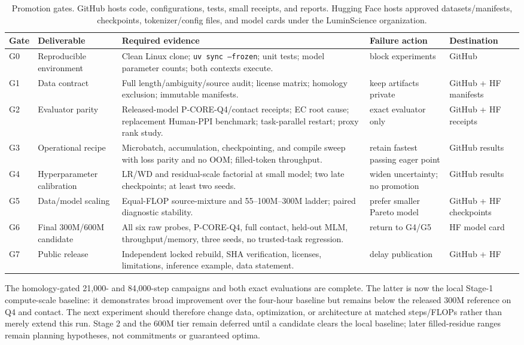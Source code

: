 \documentclass{article}
\newcommand{\code}[1]{\texttt{#1}}
\begin{document}
\begin{table}[H]
  \centering
  \scriptsize
  \setlength{\tabcolsep}{3pt}
  \begin{tabularx}{\textwidth}{@{}p{}p{}YYp{0.13\textwidth}@{}}
    \toprule
    Gate & Deliverable & Required evidence & Failure action & Destination \\
    \midrule
    G0 & Reproducible environment & Clean Linux clone; \code{uv sync --frozen}; unit tests; model parameter counts; both contexts execute. & block experiments & GitHub \\
    G1 & Data contract & Full length/ambiguity/source audit; license matrix; homology exclusion; immutable manifests. & keep artifacts private & GitHub + HF manifests \\
    G2 & Evaluator parity & Released-model P-CORE-Q4/contact receipts; EC root cause; replacement Human-PPI benchmark; task-parallel restart; proxy rank study. & exact evaluator only & GitHub + HF receipts \\
    G3 & Operational recipe & Microbatch, accumulation, checkpointing, and compile sweep with loss parity and no OOM; filled-token throughput. & retain fastest passing eager point & GitHub results \\
    G4 & Hyperparameter calibration & LR/WD and residual-scale factorial at small model; two late checkpoints; at least two seeds. & widen uncertainty; no promotion & GitHub results \\
    G5 & Data/model scaling & Equal-FLOP source-mixture and 55--100M--300M ladder; paired diagnostic stability. & prefer smaller Pareto model & GitHub + HF checkpoints \\
    G6 & Final 300M/600M candidate & All six raw probes, P-CORE-Q4, full contact, held-out MLM, throughput/memory, three seeds, no trusted-task regression. & return to G4/G5 & HF model card \\
    G7 & Public release & Independent locked rebuild, SHA verification, licenses, limitations, inference example, data statement. & delay publication & GitHub + HF \\
    \bottomrule
  \end{tabularx}
  \caption{Promotion gates. GitHub hosts code, configurations, tests, small receipts, and reports. Hugging Face hosts approved datasets/manifests, checkpoints, tokenizer/config files, and model cards under the LuminScience organization.}
\end{table}

The homology-gated 21,000- and 84,000-step campaigns and both exact evaluations
are complete. The latter is now the local Stage-1 compute-scale baseline: it
demonstrates broad improvement over the four-hour baseline but remains below the released
300M reference on Q4 and contact. The next experiment should therefore change
data, optimization, or architecture at matched steps/FLOPs rather than merely
extend this run. Stage 2 and the 600M tier remain deferred until a candidate
clears the local baseline; later filled-residue ranges remain planning
hypotheses, not commitments or guaranteed optima.
\end{document}
